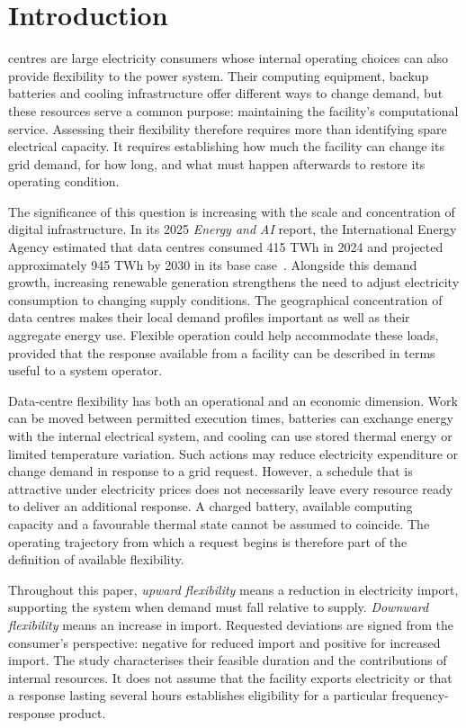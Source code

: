 \section{Introduction}
\label{sec:introduction}
 centres are large electricity consumers whose internal operating choices can also provide flexibility to the power system. Their computing equipment, backup batteries and cooling infrastructure offer different ways to change demand, but these resources serve a common purpose: maintaining the facility's computational service. Assessing their flexibility therefore requires more than identifying spare electrical capacity. It requires establishing how much the facility can change its grid demand, for how long, and what must happen afterwards to restore its operating condition.

The significance of this question is increasing with the scale and concentration of digital infrastructure. In its 2025 \emph{Energy and AI} report, the International Energy Agency estimated that data centres consumed 415 TWh in 2024 and projected approximately 945 TWh by 2030 in its base case~\cite{iea_energy_ai}. Alongside this demand growth, increasing renewable generation strengthens the need to adjust electricity consumption to changing supply conditions. The geographical concentration of data centres makes their local demand profiles important as well as their aggregate energy use. Flexible operation could help accommodate these loads, provided that the response available from a facility can be described in terms useful to a system operator.

Data-centre flexibility has both an operational and an economic dimension. Work can be moved between permitted execution times, batteries can exchange energy with the internal electrical system, and cooling can use stored thermal energy or limited temperature variation. Such actions may reduce electricity expenditure or change demand in response to a grid request. However, a schedule that is attractive under electricity prices does not necessarily leave every resource ready to deliver an additional response. A charged battery, available computing capacity and a favourable thermal state cannot be assumed to coincide. The operating trajectory from which a request begins is therefore part of the definition of available flexibility.

Throughout this paper, \emph{upward flexibility} means a reduction in electricity import, supporting the system when demand must fall relative to supply. \emph{Downward flexibility} means an increase in import. Requested deviations are signed from the consumer's perspective: negative for reduced import and positive for increased import. The study characterises their feasible duration and the contributions of internal resources. It does not assume that the facility exports electricity or that a response lasting several hours establishes eligibility for a particular frequency-response product.


